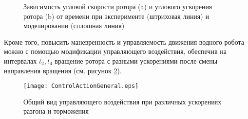 \begin{figure}[!ht]
	\begin{minipage}[h]{0.5\linewidth}
	\end{minipage}
	\hfill
	\begin{minipage}[h]{0.5\linewidth}
	\end{minipage}
	\caption{Зависимость угловой скорости ротора (a) и углового ускорения ротора (b) от времени при эксперименте (штриховая линия) и моделировании (сплошная линия)}
	\label{OmegaT1EpsilonT1}
\end{figure}



Кроме того, повысить маневренность и управляемость движения водного робота можно с помощью модификации управляющего воздействия, обеспечив на интервалах $t_2,t_4 $ вращение ротора с разными ускорениями после смены направления вращения (см. рисунок \ref{gen_cont_ac}).    

\begin{figure}[!ht]
	\centering
	\texttt{[image: ControlActionGeneral.eps]}
	\caption{Общий вид управляющего воздействия при различных ускорениях разгона и торможения}
	\label{gen_cont_ac}
\end{figure}



\clearpage